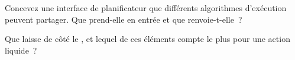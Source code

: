\begin{interviewq}\label{iq:mx:the-almgren-chriss-framework:5}
Concevez une interface de planificateur que différents algorithmes d'exécution peuvent partager. Que prend-elle en entrée et que renvoie-t-elle~?
\end{interviewq}

\begin{interviewq}\label{iq:mx:the-almgren-chriss-framework:6}
Que laisse de côté le , et lequel de ces éléments compte le plus pour une action liquide~?
\end{interviewq}
